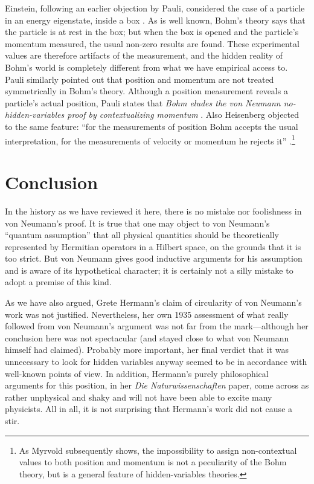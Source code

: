 \documentclass[12pt]{article}
\begin{document}
Einstein, following an earlier objection by Pauli, considered the case of a particle in an energy eigenstate, inside a box \cite[p.\@ 10]{myrvold}. As is well known, Bohm's theory says that the particle is at rest in the box; but when the box is opened and the particle's momentum measured, the usual non-zero results are found. These experimental values are therefore artifacts of the measurement, and the hidden reality of Bohm's world is completely different from what we have empirical access to. Pauli similarly pointed out that position and momentum are not treated symmetrically in Bohm's theory. Although a position measurement reveals a particle's actual position, Pauli states that \emph{Bohm eludes the von Neumann no-hidden-variables proof by contextualizing momentum} \cite[p.\@ 11]{myrvold}. Also Heisenberg objected to the same feature: ``for the measurements of position Bohm accepts the usual interpretation, for the measurements of velocity or momentum he rejects it'' \cite[p.\@ 13]{myrvold}.\footnote{As Myrvold \cite{myrvold} subsequently shows, the impossibility to assign non-contextual values to both position and momentum is not a peculiarity of the Bohm theory, but is a general feature of hidden-variables theories.}

\section{Conclusion}\label{conclusion}

In the history as we have reviewed it here, there is no mistake nor foolishness in von Neumann's proof. It is true that one may object to von Neumann's ``quantum assumption'' that all physical quantities should be theoretically represented by Hermitian operators in a Hilbert space, on the grounds that it is too strict. But von Neumann gives good inductive arguments for his assumption and is aware of its hypothetical character; it is certainly not a silly mistake to adopt a premise of this kind.

As we have also argued, Grete Hermann's claim of circularity of von Neumann's work was not justified. Nevertheless, her own 1935 assessment of what really followed from von Neumann's argument was not far from the mark---although her conclusion here was not spectacular (and stayed close to what von Neumann himself had claimed). Probably more important, her final verdict that it was unnecessary to look for hidden variables anyway seemed to be in accordance with well-known points of view. In addition, Hermann's purely philosophical arguments for this position, in her \emph{Die Naturwissenschaften} paper, come across as rather unphysical and shaky and will not have been able to excite many physicists. All in all, it is not surprising that Hermann's work did not cause a stir.
\end{document}
